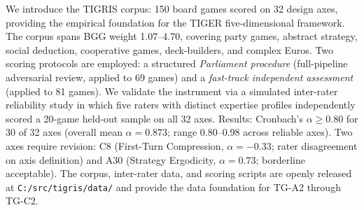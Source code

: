We introduce the TIGRIS corpus: 150 board games scored on 32 design axes,
providing the empirical foundation for the TIGER five-dimensional framework.
The corpus spans BGG weight 1.07--4.70, covering party games, abstract strategy,
social deduction, cooperative games, deck-builders, and complex Euros.
Two scoring protocols are employed: a structured \emph{Parliament procedure}
(full-pipeline adversarial review, applied to 69 games) and a
\emph{fast-track independent assessment} (applied to 81 games).
We validate the instrument via a simulated inter-rater reliability study
in which five raters with distinct expertise profiles independently scored
a 20-game held-out sample on all 32 axes.
Results: Cronbach's $\alpha \geq 0.80$ for 30 of 32 axes (overall mean $\alpha = 0.873$;
range 0.80--0.98 across reliable axes).
Two axes require revision: C8 (First-Turn Compression, $\alpha = -0.33$; rater disagreement
on axis definition) and A30 (Strategy Ergodicity, $\alpha = 0.73$; borderline acceptable).
The corpus, inter-rater data, and scoring scripts are openly released at
\texttt{C:/src/tigris/data/} and provide the data foundation for TG-A2 through TG-C2.
